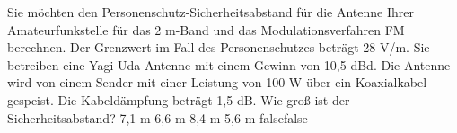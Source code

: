     {Sie möchten den Personenschutz-Sicherheitsabstand für die Antenne Ihrer Amateurfunkstelle für das 2 m-Band und das Modulationsverfahren FM berechnen. Der Grenzwert im Fall des Personenschutzes beträgt 28 V/m. Sie betreiben eine Yagi-Uda-Antenne mit einem Gewinn von 10,5 dBd. Die Antenne wird von einem Sender mit einer Leistung von 100 W über ein Koaxialkabel gespeist. Die Kabeldämpfung beträgt 1,5 dB. Wie groß ist der Sicherheitsabstand?}
    {7,1 m}
    {6,6 m}
    {8,4 m}
    {5,6 m}
    {false}{false}
